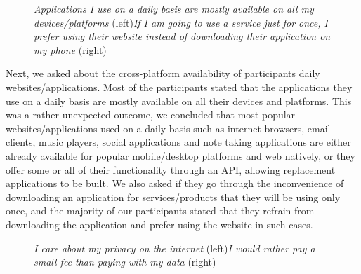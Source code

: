 
\begin{figure}[H]
\centering
{}
\vspace*{-5mm}
\caption{\newline\textit{Applications I use on a daily basis are mostly available on all my devices/platforms} (left)\newline\textit{If I am going to use a service just for once, I prefer using their website instead of downloading their application on my phone} (right)} \label{fig:ev_p1_4}
\end{figure}

Next, we asked about the cross-platform availability of participants daily websites/applications. Most of the participants stated that the applications they use on a daily basis are mostly available on all their devices and platforms. This was a rather unexpected outcome, we concluded that most popular websites/applications used on a daily basis such as internet browsers, email clients, music players, social applications and note taking applications are either already available for popular mobile/desktop platforms and web natively, or they offer some or all of their functionality through an API, allowing replacement applications to be built. We also asked if they go through the inconvenience of downloading an application for services/products that they will be using only once, and the majority of our participants stated that they refrain from downloading the application and prefer using the website in such cases.


\begin{figure}[H]
\centering
{}
\vspace*{-5mm}
\caption{\newline\textit{I care about my privacy on the internet} (left)\newline\textit{I would rather pay a small fee than paying with my data} (right)} \label{fig:ev_p1_5}
\end{figure}

